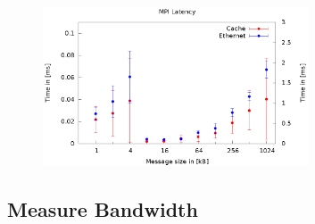 \documentclass[a4paper,11pt]{scrartcl}
\begin{document}
\begin{figure}[!ht]
\centering
\includegraphics[width=0.7\textwidth,keepaspectratio]{3_3/data/plot.eps}
\end{figure}



\subsection{Measure Bandwidth}
\end{document}
